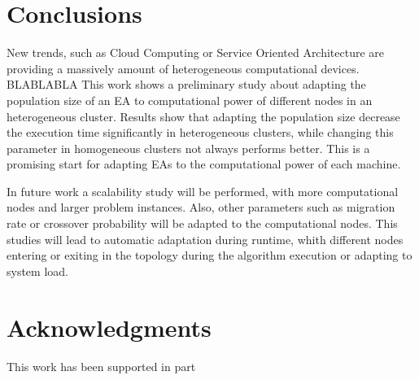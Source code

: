 \documentclass{sig-alternate}
\begin{document}


\section{Conclusions}
New trends, such as Cloud Computing or Service Oriented Architecture are providing a massively amount of heterogeneous computational devices. BLABLABLA This work shows a preliminary study about adapting the population size of an EA to computational power of different nodes in an heterogeneous cluster. Results show that adapting the population size decrease the execution time significantly in heterogeneous clusters, while changing this parameter in homogeneous clusters not always performs better. This is a promising start for adapting EAs to the computational power of each machine.

In future work a scalability study will be performed, with more computational nodes and larger problem instances. Also, other parameters such as migration rate or crossover probability will be adapted to the computational nodes. This studies will lead to automatic adaptation during runtime, whith different nodes entering or exiting in the topology during the algorithm execution or adapting to system load.


\section{Acknowledgments}
This work has been supported in part %

%



\end{document}
